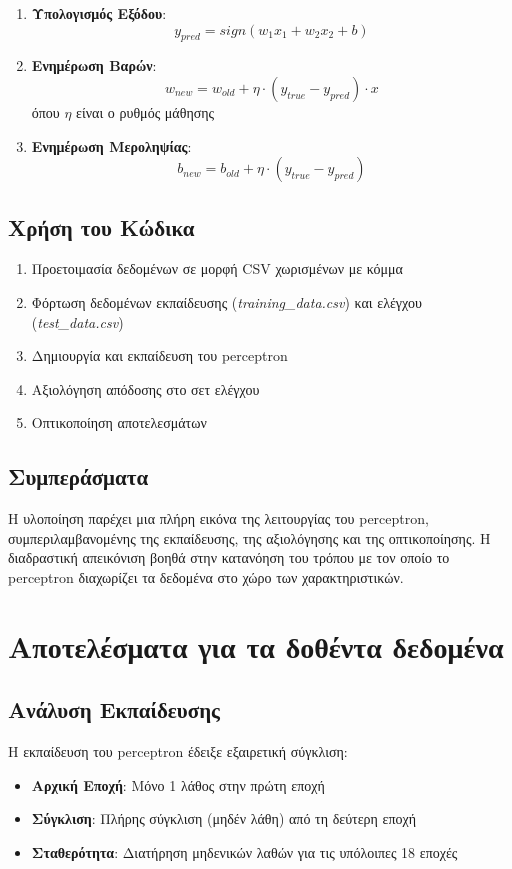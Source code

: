 \documentclass[12pt,a4paper,twoside]{book}
\begin{document}
\begin{enumerate}
    \item \textbf{Υπολογισμός Εξόδου}:
    \[y_{pred} = sign(w_1x_1 + w_2x_2 + b)\]
    \item \textbf{Ενημέρωση Βαρών}:
    \[w_{new} = w_{old} + \eta \cdot (y_{true} - y_{pred}) \cdot x\]
    όπου $\eta$ είναι ο ρυθμός μάθησης
    \item \textbf{Ενημέρωση Μεροληψίας}:
    \[b_{new} = b_{old} + \eta \cdot (y_{true} - y_{pred})\]
\end{enumerate}

\section{Χρήση του Κώδικα}
\begin{enumerate}
    \item Προετοιμασία δεδομένων σε μορφή CSV χωρισμένων με κόμμα
    \item Φόρτωση δεδομένων εκπαίδευσης (\textit{training\_data.csv}) και ελέγχου (\textit{test\_data.csv})
    \item Δημιουργία και εκπαίδευση του perceptron
    \item Αξιολόγηση απόδοσης στο σετ ελέγχου
    \item Οπτικοποίηση αποτελεσμάτων
\end{enumerate}

\section{Συμπεράσματα}
Η υλοποίηση παρέχει μια πλήρη εικόνα της λειτουργίας του perceptron, συμπεριλαμβανομένης της εκπαίδευσης, της αξιολόγησης και της οπτικοποίησης. Η διαδραστική απεικόνιση βοηθά στην κατανόηση του τρόπου με τον οποίο το perceptron διαχωρίζει τα δεδομένα στο χώρο των χαρακτηριστικών.

\chapter{Αποτελέσματα για τα δοθέντα δεδομένα}

\section{Ανάλυση Εκπαίδευσης}

Η εκπαίδευση του perceptron έδειξε εξαιρετική σύγκλιση:

\begin{itemize}
    \item \textbf{Αρχική Εποχή}: Μόνο 1 λάθος στην πρώτη εποχή
    \item \textbf{Σύγκλιση}: Πλήρης σύγκλιση (μηδέν λάθη) από τη δεύτερη εποχή
    \item \textbf{Σταθερότητα}: Διατήρηση μηδενικών λαθών για τις υπόλοιπες 18 εποχές
\end{itemize}
\end{document}
